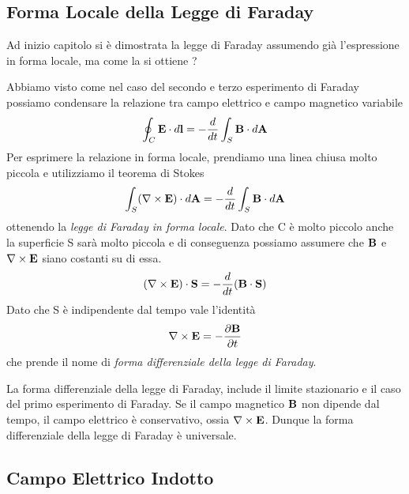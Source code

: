 \subsection{Forma Locale della Legge di Faraday}
Ad inizio capitolo si \`e dimostrata la legge di Faraday assumendo gi\`a l'espressione in forma locale, ma come la si ottiene ?

Abbiamo visto come nel caso del secondo e terzo esperimento di Faraday possiamo condensare la relazione tra campo elettrico e campo magnetico variabile 
\begin{equation*}
	\oint_{C} \bold{E} \cdot d\bold{l} = - \frac{d}{dt} \int_{S} \bold{B} \cdot d\bold{A}
\end{equation*}
Per esprimere la relazione in forma locale, prendiamo una linea chiusa molto piccola e utilizziamo il teorema di Stokes 
\begin{equation*}
	\int_{S} (\nabla \times \bold{E}) \cdot d\bold{A} = - \frac{d}{dt} \int_{S} \bold{B} \cdot d\bold{A}
\end{equation*}
ottenendo la \textit{legge di Faraday in forma locale}. Dato che C \`e molto piccolo anche la superficie S sar\`a molto piccola e di conseguenza possiamo assumere che $\bold{B}$ e $\nabla \times \bold{E}$ siano costanti su di essa.
\begin{equation*}
	(\nabla \times \bold{E}) \cdot \bold{S} = - \frac{d}{dt}(\bold{B} \cdot \bold{S})
\end{equation*}
Dato che S \`e indipendente dal tempo vale l'identit\`a 
\begin{equation*}
	\nabla \times \bold{E} = - \frac{\partial \bold{B}}{\partial t}
\end{equation*}
che prende il nome di \textit{forma differenziale della legge di Faraday}.

La forma differenziale della legge di Faraday, include il limite stazionario e il caso del primo esperimento di Faraday. Se il campo magnetico $\bold{B}$ non dipende dal tempo, il campo elettrico \`e conservativo, ossia $\nabla \times \bold{E}$. Dunque la forma differenziale della legge di Faraday \`e universale.

\subsection{Campo Elettrico Indotto}

